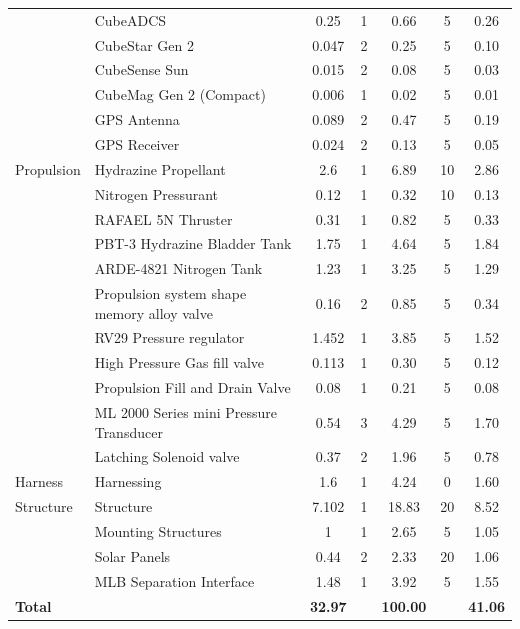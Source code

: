 \documentclass[a4paper, 11pt, conference]{IEEEtran}
\begin{document}
\begin{table}[H]
\begin{sideways}
\begin{tabularx}{0.9\textheight}{l X c c c c c}
            & CubeADCS & 0.25 & 1 & 0.66 & 5 & 0.26 \\
            & CubeStar Gen 2 & 0.047 & 2 & 0.25 & 5 & 0.10 \\
            & CubeSense Sun & 0.015 & 2 & 0.08 & 5 & 0.03 \\
            & CubeMag Gen 2 (Compact) & 0.006 & 1 & 0.02 & 5 & 0.01 \\
            & GPS Antenna & 0.089 & 2 & 0.47 & 5 & 0.19 \\
            & GPS Receiver & 0.024 & 2 & 0.13 & 5 & 0.05 \\
\midrule
Propulsion  & Hydrazine Propellant & 2.6 & 1 & 6.89 & 10 & 2.86 \\
            & Nitrogen Pressurant & 0.12 & 1 & 0.32 & 10 & 0.13 \\
            & RAFAEL 5N Thruster & 0.31 & 1 & 0.82 & 5 & 0.33 \\
            & PBT-3 Hydrazine Bladder Tank & 1.75 & 1 & 4.64 & 5 & 1.84 \\
            & ARDE-4821 Nitrogen Tank & 1.23 & 1 & 3.25 & 5 & 1.29 \\
            & Propulsion system shape memory alloy valve & 0.16 & 2 & 0.85 & 5 & 0.34 \\
            & RV29 Pressure regulator & 1.452 & 1 & 3.85 & 5 & 1.52 \\
            & High Pressure Gas fill valve & 0.113 & 1 & 0.30 & 5 & 0.12 \\
            & Propulsion Fill and Drain Valve & 0.08 & 1 & 0.21 & 5 & 0.08 \\
            & ML 2000 Series mini Pressure Transducer & 0.54 & 3 & 4.29 & 5 & 1.70 \\
            & Latching Solenoid valve & 0.37 & 2 & 1.96 & 5 & 0.78 \\
\midrule
Harness     & Harnessing & 1.6 & 1 & 4.24 & 0 & 1.60 \\
\midrule
Structure   & Structure & 7.102 & 1 & 18.83 & 20 & 8.52 \\
            & Mounting Structures & 1 & 1 & 2.65 & 5 & 1.05 \\
            & Solar Panels & 0.44 & 2 & 2.33 & 20 & 1.06 \\
            & MLB Separation Interface & 1.48 & 1 & 3.92 & 5 & 1.55 \\
\midrule
\textbf{Total} & & \textbf{32.97} &  & \textbf{100.00} &  & \textbf{41.06} \\
\bottomrule
\end{tabularx}
\end{sideways}
\end{table}
\end{document}
